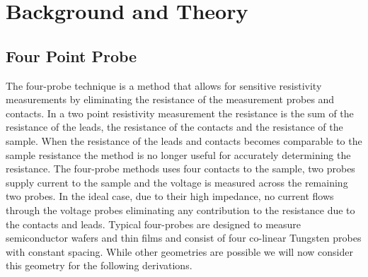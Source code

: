 
\chapter{Background and Theory}


\section{Four Point Probe}

    
    The four-probe technique is a method that allows for sensitive resistivity measurements by eliminating the resistance of the measurement probes and contacts. In a two point resistivity measurement the resistance is the sum of the resistance of the leads, the resistance of the contacts and the resistance of the sample. %
    When the resistance of the leads and contacts becomes comparable to the sample resistance the method is no longer useful for accurately determining the resistance. The four-probe methods uses four contacts to the sample, two probes supply current to the sample and the voltage is measured across the remaining two probes. In the ideal case, due to their high impedance, no current flows through the voltage probes eliminating any contribution to the resistance due to the contacts and leads. Typical four-probes are designed to measure semiconductor wafers and thin films and consist of four co-linear Tungsten probes with constant spacing. While other geometries are possible %
    we will now consider this geometry for the following derivations. 
    
